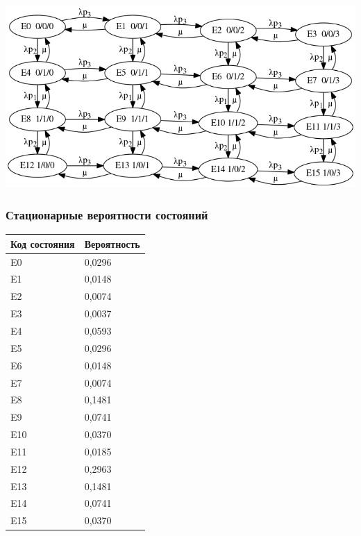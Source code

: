 \includegraphics[resolution=128]{img/g2.png}

\subsubsection{Стационарные вероятности состояний}

\begin{tabular}{|l|l|}
\hline
Код состояния & Вероятность \\ \hline
E0            & 0,0296      \\ \hline
E1            & 0,0148      \\ \hline
E2            & 0,0074      \\ \hline
E3            & 0,0037      \\ \hline
E4            & 0,0593      \\ \hline
E5            & 0,0296      \\ \hline
E6            & 0,0148      \\ \hline
E7            & 0,0074      \\ \hline
E8            & 0,1481      \\ \hline
E9            & 0,0741      \\ \hline
E10           & 0,0370      \\ \hline
E11           & 0,0185      \\ \hline
E12           & 0,2963      \\ \hline
E13           & 0,1481      \\ \hline
E14           & 0,0741      \\ \hline
E15           & 0,0370      \\ \hline

\end{tabular}

